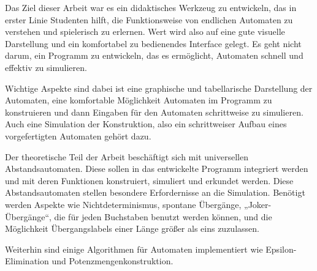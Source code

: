 Das Ziel dieser Arbeit war es ein didaktisches Werkzeug zu entwickeln, das in erster Linie Studenten hilft, die Funktionsweise von endlichen Automaten zu verstehen und spielerisch zu erlernen. Wert wird also auf eine gute visuelle Darstellung und ein komfortabel zu bedienendes Interface gelegt. Es geht nicht darum, ein Programm zu entwickeln, das es ermöglicht, Automaten schnell und effektiv zu simulieren.

Wichtige Aspekte sind dabei ist eine graphische und tabellarische Darstellung der Automaten, eine komfortable Möglichkeit Automaten im Programm zu konstruieren und dann Eingaben für den Automaten schrittweise zu simulieren. Auch eine Simulation der Konstruktion, also ein schrittweiser Aufbau eines vorgefertigten Automaten gehört dazu.

Der theoretische Teil der Arbeit beschäftigt sich mit universellen Abstandsautomaten. Diese sollen in das entwickelte Programm integriert werden und mit deren Funktionen konstruiert, simuliert und erkundet werden. Diese Abstandsautomaten stellen besondere Erfordernisse an die Simulation. Benötigt werden Aspekte wie Nichtdeterminismus, spontane Übergänge, „Joker-Übergänge“, die für jeden Buchstaben benutzt werden können, und die Möglichkeit Übergangslabels einer Länge größer als eins zuzulassen.

Weiterhin sind einige Algorithmen für Automaten implementiert wie Epsilon-Eli\-mination und Potenzmengenkonstruktion.
